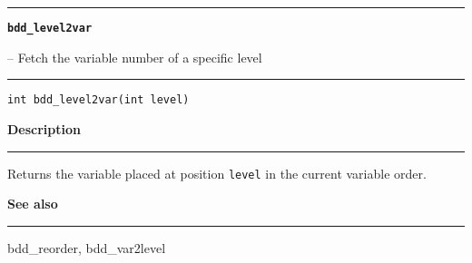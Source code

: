 \begin{minipage}{\textwidth}

\noindent\begin{minipage}{\textwidth}
\rule{\textwidth}{0.5mm}
{\tt\bf bdd\_level2var }
\--- Fetch the variable number of a specific level  \hspace{\fill}
\\\rule[1.5ex]{\textwidth}{0.5mm}
\end{minipage}

\noindent\begin{verbatim}
int bdd_level2var(int level) 
\end{verbatim}

\vspace{\parsep}\noindent
{\bf Description}\\\rule[1.5ex]{\textwidth}{0.2mm}\vspace{-1.5ex}\setlength{\parindent}{1em}
Returns the variable placed at position {\tt level} in the
           current variable order. 

\vspace{\parsep}\vspace{\baselineskip}\noindent
{\bf See also}\\\rule[1.5ex]{\textwidth}{0.2mm}\vspace{-1.5ex}
bdd\_reorder, bdd\_var2level 
\end{minipage}
\vspace{8ex}
